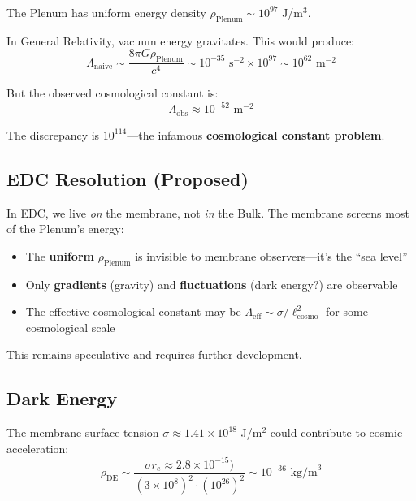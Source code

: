 The Plenum has uniform energy density $\rho_{\text{Plenum}} \sim 10^{97}$ J/m$^3$.

In General Relativity, vacuum energy gravitates. This would produce:
\begin{equation}
\Lambda_{\text{naive}} \sim \frac{8\pi G \rho_{\text{Plenum}}}{c^4} \sim 10^{-35} \text{ s}^{-2} \times 10^{97} \sim 10^{62} \text{ m}^{-2}
\end{equation}

But the observed cosmological constant is:
\begin{equation}
\Lambda_{\text{obs}} \approx 10^{-52} \text{ m}^{-2}
\end{equation}

The discrepancy is $10^{114}$—the infamous \textbf{cosmological constant problem}.

\subsection{EDC Resolution (Proposed)}

In EDC, we live \textit{on} the membrane, not \textit{in} the Bulk. The membrane screens most of the Plenum's energy:

\begin{itemize}
    \item The \textbf{uniform} $\rho_{\text{Plenum}}$ is invisible to membrane observers—it's the ``sea level''
    \item Only \textbf{gradients} (gravity) and \textbf{fluctuations} (dark energy?) are observable
    \item The effective cosmological constant may be $\Lambda_{\text{eff}} \sim \sigma/\ell_{\text{cosmo}}^2$ for some cosmological scale
\end{itemize}

This remains speculative and requires further development.

\subsection{Dark Energy}

The membrane surface tension $\sigma \approx 1.41 \times 10^{18}$ J/m$^2$ could contribute to cosmic acceleration:
\begin{equation}
\rho_{\text{DE}} \sim \frac{\sigma r_e \approx 2.8 \times 10^{-15})}{(3 \times 10^8)^2 \cdot (10^{26})^2} \sim 10^{-36} \text{ kg/m}^3
\end{equation}

